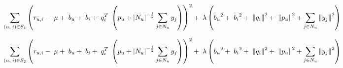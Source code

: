 \documentclass[12pt, oneside]{article}
\begin{document}
\begin{equation}
\label{eq:isvd++_min1}
\mathop \sum \limits_{\left( {u,\;i} \right) \in S_1} {\left( {{r_{u,i}} - \;\mu  + \;{b_u} + \;{b_i} + \;q_i^T\;\left( {{p_u} + {{\left| {{N_u}} \right|}^{ - \frac{1}{2}}}\sum\limits_{j  \in {N_u}} {{y_j}} } \right)} \right)^2} \\[\jot]\\+ \;\lambda \left( {{b_u}^2 + \;{b_i}^2 + \;{{\left\| {{q_i}} \right\|}^2} + \;{{\left\| {{p_u}} \right\|}^2} + \sum\limits_{j \in {N_u}} {{{\left\| {{y_j}} \right\|}^2}} } \right)
\end{equation}

\begin{equation}
\label{eq:isvd++_min2}
\mathop \sum \limits_{\left( {u,\;i} \right) \in S_2} {\left( {{r_{u,i}} - \;\mu  + \;{b_u} + \;{b_i} + \;q_i^T\;\left( {{p_u} + {{\left| {{N_u}} \right|}^{ - \frac{1}{2}}}\sum\limits_{j  \in {N_u}} {{y_j}} } \right)} \right)^2} \\[\jot]\\+ \;\lambda \left( {{b_u}^2 + \;{b_i}^2 + \;{{\left\| {{q_i}} \right\|}^2} + \;{{\left\| {{p_u}} \right\|}^2} + \sum\limits_{j \in {N_u}} {{{\left\| {{y_j}} \right\|}^2}} } \right)
\end{equation}
\end{document}
